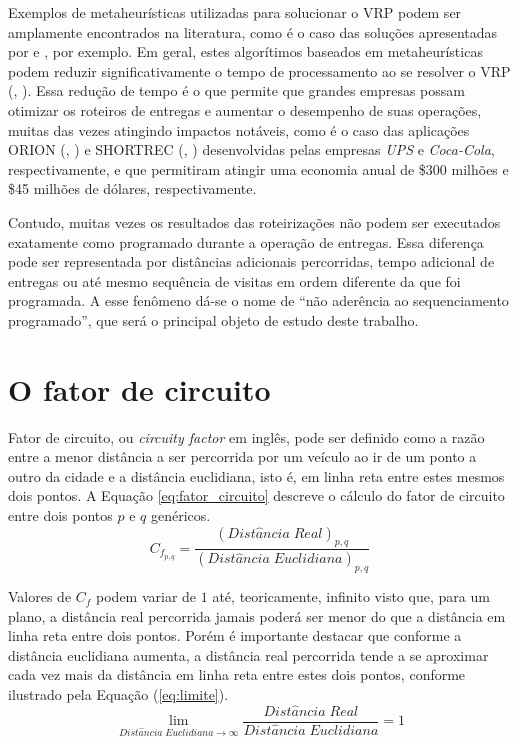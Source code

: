 Exemplos de metaheurísticas utilizadas para solucionar o VRP podem ser amplamente encontrados na literatura, como é o caso das soluções apresentadas por  e , por exemplo.
Em geral, estes algorítimos baseados em metaheurísticas podem reduzir significativamente o tempo de processamento ao se resolver o VRP (, \citeyear{Golden1998}).
Essa redução de tempo é o que permite que grandes empresas possam otimizar os roteiros de entregas e aumentar o desempenho de suas operações, muitas das vezes atingindo impactos notáveis, como é o caso das aplicações ORION (, \citeyear{holland2017ups}) e SHORTREC (, \citeyear{kant2008coca}) desenvolvidas pelas empresas \textit{UPS} e \textit{Coca-Cola}, respectivamente, e que permitiram atingir uma economia anual de \$300 milhões e \$45 milhões de dólares, respectivamente.

Contudo, muitas vezes os resultados das roteirizações não podem ser executados exatamente como programado durante a operação de entregas.
Essa diferença pode ser representada por distâncias adicionais percorridas, tempo adicional de entregas ou até mesmo sequência de visitas em ordem diferente da que foi programada.
A esse fenômeno dá-se o nome de ``não aderência ao sequenciamento programado'', que será o principal objeto de estudo deste trabalho.

\section{O fator de circuito} \label{sec:fatorCircuito}
Fator de circuito, ou \textit{circuity factor} em inglês, pode ser definido como a razão entre a menor distância a ser percorrida por um veículo ao ir de um ponto a outro da cidade e a distância euclidiana, isto é, em linha reta entre estes mesmos dois pontos. 
A Equação \ref{eq:fator_circuito} descreve o cálculo do fator de circuito entre dois pontos $p$ e $q$ genéricos.
%
\begin{equation} \label{eq:fator_circuito}
    C_{f_{p, q}} = \frac{(Dist\hat{a}ncia\;Real)_{p, q}}{(Dist\hat{a}ncia\;Euclidiana)_{p, q}}
\end{equation}

Valores de $C_{f}$ podem variar de $1$ até, teoricamente, infinito visto que, para um plano, a distância real percorrida jamais poderá ser menor do que a distância em linha reta entre dois pontos.
Porém é importante destacar que conforme a distância euclidiana aumenta, a distância real percorrida tende a se aproximar cada vez mais da distância em linha reta entre estes dois pontos, conforme ilustrado pela Equação (\ref{eq:limite}).
%
\begin{equation} \label{eq:limite}
    \lim_{Dist\hat{a}ncia\;Euclidiana \rightarrow \infty} \frac{Dist\hat{a}ncia\;Real}{Dist\hat{a}ncia\;Euclidiana} = 1
\end{equation}

